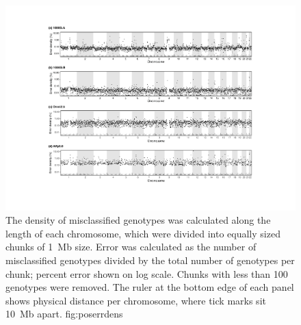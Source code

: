 

\begin{figure}[tbp]
\includegraphics[width=\textwidth]{./img/ch4/poserrdens_new}
%
{The density of misclassified genotypes was calculated along the length of each chromosome, which were divided into equally sized chunks of 1~Mb size.
Error was calculated as the number of misclassified genotypes divided by the total number of genotypes per chunk; percent error shown on log scale.
Chunks with less than 100 genotypes were removed.
The ruler at the bottom edge of each panel shows physical distance per chromosome, where tick marks sit 10~Mb apart.}%
{fig:poserrdens}
\end{figure}
